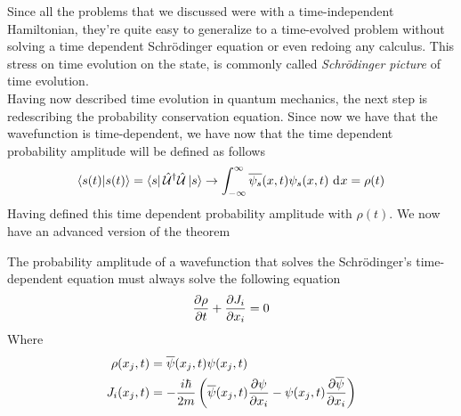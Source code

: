 \documentclass[../qm.tex]{subfiles}
\begin{document}
	Since all the problems that we discussed were with a time-independent Hamiltonian, they're quite easy to generalize to a time-evolved problem without solving a time dependent Schrödinger equation or even redoing any calculus.
	This stress on time evolution on the state, is commonly called \textit{Schrödinger picture} of time evolution.\\
	Having now described time evolution in quantum mechanics, the next step is redescribing the probability conservation equation. Since now we have that the wavefunction is time-dependent, we have now that the time dependent probability amplitude will be defined as follows
	\begin{equation*}
		\braket{s(t)}=\bra{s}\hat{\mathcal{U}}^{\dagger}\hat{\mathcal{U}}\ket{s}\to\int_{-\infty}^{\infty}\overline{\psi_s}(x,t)\psi_s(x,t)\ \mathrm{d}^{}x=\rho(t)
	\end{equation*}
	Having defined this time dependent probability amplitude with $\rho(t)$. We now have an advanced version of the theorem %
	\begin{thm}
		The probability amplitude of a wavefunction that solves the Schrödinger's time-dependent equation must always solve the following equation
		\begin{equation*}
			\pdv{\rho}{t}+\pdv{J_i}{x_i}=0
		\end{equation*}
		Where
		\begin{equation*}
			\begin{aligned}
				\rho(x_j,t)&=\overline{\psi}(x_j,t)\psi(x_j,t)\\
				J_i(x_j,t)&=-\frac{i\hbar}{2m}\left( \overline{\psi}(x_j,t)\pdv{\psi}{x_i}-\psi(x_j,t)\pdv{\overline{\psi}}{x_i} \right)
			\end{aligned}
		\end{equation*}
	\end{thm}
\end{document}

